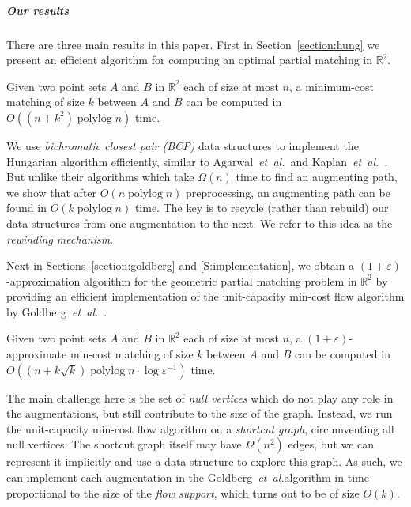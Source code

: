 \documentclass[a4paper,UKenglish]{socg-lipics-v2018}
\def\etal{\emph{et~al.}}
\def\etal{\textit{et~al.}}
\def\polylog{\mathop{\mathrm{polylog}}}
\def\eps{\varepsilon}
\def\reals{\mathbb{R}}
\theoremstyle{plain}
\numberwithin{figure}{section}
\renewcommand{\paragraph}{\subparagraph}
\begin{document}
\paragraph{Our results}
There are three main results in this paper.
First in Section~\ref{section:hung} we present an efficient algorithm for
computing an optimal partial matching in $\reals^2$.

\begin{theorem}
\label{theorem:hung}
Given two point sets $A$ and $B$ in $\reals^2$ each of size at most $n$,
a minimum-cost matching of size $k$ between $A$ and $B$ can be computed in
$O((n + k^2)\polylog n)$ time.
\end{theorem}

We use \emph{bichromatic closest pair (BCP)} data structures to implement the Hungarian algorithm efficiently, similar to Agarwal~\etal\ and Kaplan~\etal~\cite{KMRSS17,AES99}.
But unlike their algorithms which take $\Omega(n)$ time to find an
augmenting path, we show that after $O(n\polylog n)$ preprocessing,
an augmenting path can be found in $O(k\polylog n)$ time.
The key is to recycle (rather than rebuild) our data structures from one
augmentation to the next.
We refer to this idea as the \emph{rewinding mechanism}.

\medskip

Next in Sections~\ref{section:goldberg} and \ref{S:implementation},
we obtain a $(1+\eps)$-approximation algorithm for the geometric partial
matching problem in $\reals^2$ by providing an efficient implementation of the
unit-capacity min-cost flow algorithm by Goldberg~\etal~\cite{GHKT17}.

\begin{theorem}
\label{theorem:gmcm}
Given two point sets $A$ and $B$ in $\reals^2$ each of size at most $n$,
a $(1+\eps)$-approximate min-cost matching of size $k$ between $A$
and $B$ can be computed in $O((n + k\sqrt{k})\polylog n \cdot \log\eps^{-1})$ time.
\end{theorem}

The main challenge here is the set of \emph{null vertices}
which do not play any role in the augmentations, but still contribute to the size of the graph.
Instead, we run the unit-capacity min-cost flow algorithm on a
\emph{shortcut graph}, circumventing all null vertices.
The shortcut graph itself may have $\Omega(n^2)$ edges,
but we can represent it implicitly and use a data structure to explore this graph.
As such, we can implement each augmentation in the Goldberg~\etal algorithm in
time proportional to the size of the \emph{flow support}, which turns out to be of size $O(k)$.
\end{document}
